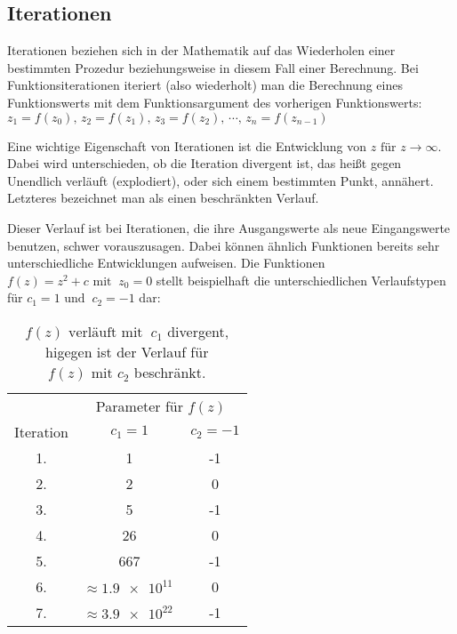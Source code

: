 \subsection{Iterationen}\label{subsec:iterations}

Iterationen beziehen sich in der Mathematik auf das Wiederholen einer bestimmten
Prozedur beziehungsweise in diesem Fall einer Berechnung.
Bei Funktionsiterationen iteriert (also wiederholt) man die Berechnung eines
Funktionswerts mit dem Funktionsargument des vorherigen Funktionswerts:
\(z_1 = f(z_0),\, z_2 = f(z_1),\, z_3 = f(z_2),\, \cdots,\, z_n = f(z_{n-1})\)

Eine wichtige Eigenschaft von
Iterationen ist die Entwicklung von \(z \text{ für } z \to \infty\).
Dabei wird unterschieden, ob die Iteration divergent ist,
das heißt gegen Unendlich verl\"auft (\glqq explodiert\grqq),
oder sich einem bestimmten Punkt, ann\"ahert.
Letzteres bezeichnet man als einen beschränkten Verlauf.

Dieser Verlauf ist bei Iterationen, die ihre Ausgangswerte als neue Eingangswerte
benutzen, schwer vorauszusagen.
Dabei k\"onnen \"ahnlich Funktionen bereits sehr unterschiedliche Entwicklungen aufweisen.
Die Funktionen \(f(z) = z^2 + c \text{ mit }\ z_0 = 0\) stellt beispielhaft
die unterschiedlichen Verlaufstypen für \(c_1 = 1 \text{ und }\ c_2 = -1\) dar:

\begin{table}[h!]\label{tab:iterations-example}
  \centering
  \begin{tabular}{@{}ccc@{}}
    \toprule
    & \multicolumn{2}{c}{Parameter für \(f(z)\)} \\
    \cmidrule(lr){2-3}
    Iteration & \( c_1 = 1\) & \( c_2 = -1\) \\
    \midrule
    1. & 1 & -1 \\
    2. & 2 & 0 \\
    3. & 5 & -1 \\
    4. & 26 & 0 \\
    5. & 667 & -1 \\
    6. & \(\approx \num{1,9e11}\ \) & 0 \\
    7. & \(\approx \num{3,9e22}\ \) & -1 \\
    \bottomrule
  \end{tabular}
  \caption{
    \(f(z) \text{ verl\"auft mit }\ c_1\) divergent,
    higegen ist der Verlauf f\"ur \(f(z) \text{ mit } c_2\) beschr\"ankt.
  }
\end{table}